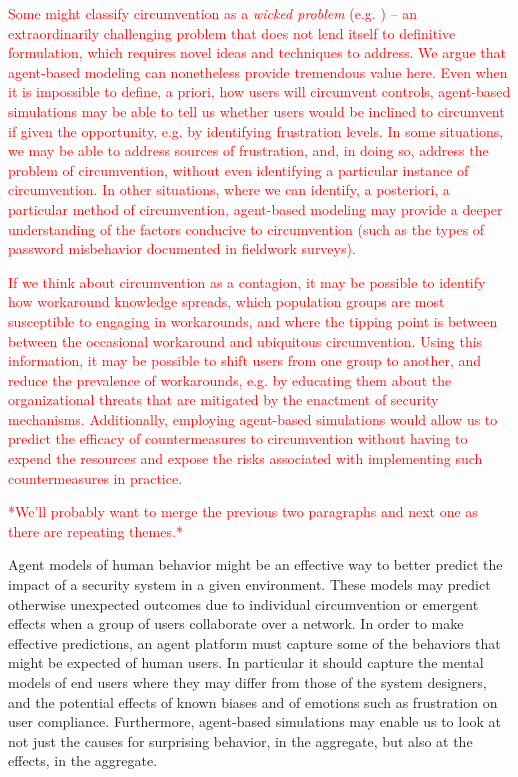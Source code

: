 \documentclass{acm_proc_article-sp}
\begin{document}
\textcolor{red}{Some might classify circumvention as a \textit{wicked problem} 
(e.g. \cite{rittel1973dilemmas}) -- 
an extraordinarily challenging problem that does not lend itself to definitive formulation, 
which requires novel ideas and techniques to address. 
We argue that agent-based modeling can nonetheless provide tremendous value here. 
Even when it is impossible to define, a priori, how users will circumvent controls, 
agent-based simulations may be able to tell us whether users would be 
inclined to circumvent if given the opportunity, e.g. by identifying frustration levels.
In some situations, we may be able to address sources of frustration, 
and, in doing so, address the problem of circumvention, without even identifying a 
particular instance of circumvention. In other situations, where we can identify, a posteriori, 
a particular method of circumvention, agent-based modeling may provide a deeper 
understanding of the factors conducive to circumvention 
(such as the types of password misbehavior documented in fieldwork surveys). }

\textcolor{red}{If we think about circumvention as a contagion, it may be possible to identify how workaround
knowledge spreads, which population groups are most susceptible to engaging in workarounds, 
and where the tipping point is between between the occasional workaround and ubiquitous circumvention. 
Using this information, it may be possible to shift users from one group to another, and 
reduce the prevalence of workarounds, e.g. by educating them about the 
organizational threats that are mitigated by the enactment of security mechanisms.
Additionally, employing agent-based simulations would allow us to predict 
the efficacy of countermeasures to circumvention without having to expend the resources 
and expose the risks associated with implementing such countermeasures in practice.}

\textcolor{red}{*We'll probably want to merge the previous two paragraphs and next one as there 
are repeating themes.*}

Agent models of human behavior might be an effective way to better
predict the impact of a security system in a given environment. These
models may predict otherwise unexpected outcomes due to individual
circumvention or emergent effects when a group of users collaborate
over a network. In order to make effective predictions, an agent
platform must capture some of the behaviors that might be expected of
human users. In particular it should capture the mental models of end
users where they may differ from those of the system designers, and
the potential effects of known biases and of emotions such as
frustration on user compliance.  Furthermore, agent-based simulations
may enable us to look at not just the causes for surprising behavior,
in the aggregate, but also at the effects, in the aggregate.
\end{document}
